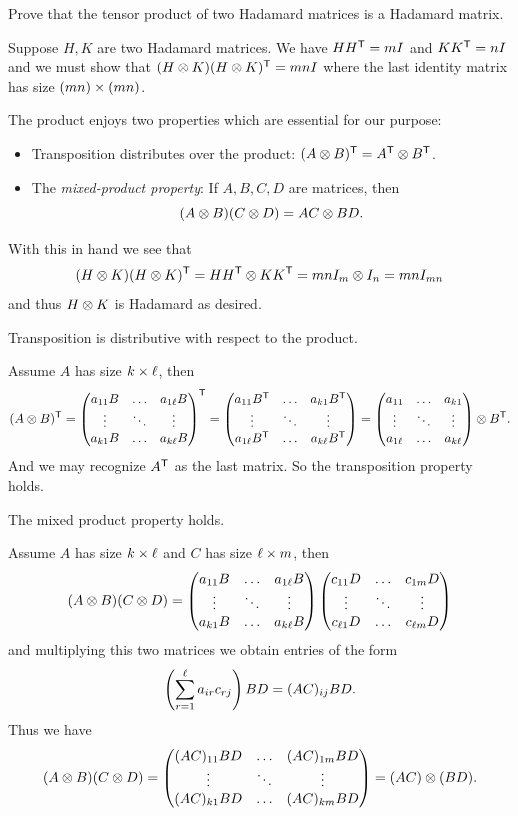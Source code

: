 \documentclass[12pt]{memoir}
\begin{document}
\begin{Ej}[Exercise 1]
    Prove that the tensor product of two Hadamard matrices is a Hadamard matrix.
\end{Ej}

\begin{ptcbr}
Suppose $H,K$ are two Hadamard matrices. We have $HH^{\mathsf{T}}=mI$ and $KK^{\mathsf{T}}=nI$ and we must show that $(H\otimes K)(H\otimes K)^{\mathsf{T}}=mnI$ where the last identity matrix has size $(mn)\times(mn)$.\par 
The product enjoys two properties which are essential for our purpose:
\begin{itemize}
    \item Transposition distributes over the product: $(A\otimes B)^{\mathsf{T}}=A^{\mathsf{T}}\otimes B^{\mathsf{T}}$.
    \item The \emph{mixed-product property}: If $A,B,C,D$ are matrices, then 
    $$(A\otimes B)(C\otimes D)=AC\otimes BD.$$
\end{itemize}
With this in hand we see that
$$(H\otimes K)(H\otimes K)^{\mathsf{T}}=HH^{\mathsf{T}}\otimes KK^{\mathsf{T}}=mn I_m\otimes I_n=mn I_{mn}$$
and thus $H\otimes K$ is Hadamard as desired.
\end{ptcbr}
\begin{Lem}
Transposition is distributive with respect to the product.
\end{Lem}

\begin{ptcbp}
Assume $A$ has size $k\times\ell$, then
$$(A\otimes B)^{\mathsf{T}}=\begin{pmatrix} a_{11}B & \dots & a_{1\ell}B \\ \vdots & \ddots & \vdots \\ a_{k1}B & \dots & a_{k\ell}B \end{pmatrix}^{\mathsf{T}}=\begin{pmatrix} a_{11}B^{\mathsf{T}} & \dots & a_{k1}B^{\mathsf{T}} \\ \vdots & \ddots & \vdots \\ a_{1\ell}B^{\mathsf{T}} & \dots & a_{k\ell}B^{\mathsf{T}} \end{pmatrix}=\begin{pmatrix} a_{11} & \dots & a_{k1} \\ \vdots & \ddots & \vdots \\ a_{1\ell} & \dots & a_{k\ell} \end{pmatrix}\otimes B^{\mathsf{T}}.$$
And we may recognize $A^{\mathsf{T}}$ as the last matrix. So the transposition property holds.
\end{ptcbp}

\begin{Lem}
The mixed product property holds.
\end{Lem}

\begin{ptcbp}
Assume $A$ has size $k\times\ell$ and $C$ has size $\ell\times m$, then
$$(A\otimes B)(C\otimes D)=\begin{pmatrix} a_{11}B & \dots & a_{1\ell}B \\ \vdots & \ddots & \vdots \\ a_{k1}B & \dots & a_{k\ell}B \end{pmatrix}\begin{pmatrix} c_{11}D & \dots & c_{1m}D \\ \vdots & \ddots & \vdots \\ c_{\ell1}D & \dots & c_{\ell m}D \end{pmatrix}$$
and multiplying this two matrices we obtain entries of the form 
$$\left(\sum_{r=1}^{\ell}a_{ir}c_{rj}\right)BD=(AC)_{ij}BD.$$
Thus we have 
$$(A\otimes B)(C\otimes D)=\begin{pmatrix} (AC)_{11}BD & \dots & (AC)_{1m}BD \\ \vdots & \ddots & \vdots \\ (AC)_{k1}BD & \dots & (AC)_{km}BD \end{pmatrix}=(AC)\otimes(BD).$$
\end{ptcbp}
\end{document}

